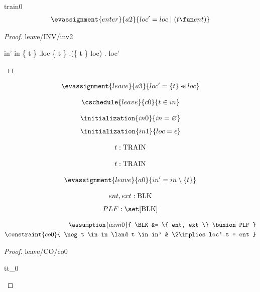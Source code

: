 \documentclass[12pt]{amsart}
\begin{document}
\begin{machine}{train0}
\begin{align*}
\evassignment{enter}{a2}
{	loc' = loc  \1| (t \fun ent)	}
\end{align*}

\begin{proof}{leave/INV/inv2}
	\begin{calculation}
		in'
	\hint{=}{ \ref{a0} }
		in \setminus \{ t \}
	\hint{=}{ \ref{inv2} }
		\dom.loc \setminus \{ t \}
		\dom.(\{ t \} \domsub loc)
	\hint{=}{ \ref{a3} } 
		\dom. loc' 
	\end{calculation}
\end{proof}

\begin{align*}
\evassignment{leave}{a3}
{	loc' = \{ t \} \domsub loc 	}
\end{align*}

\begin{align*}
\cschedule{leave}{c0}
{	t \in in}
\end{align*}

\begin{align*}
\initialization{in0}
{	in = \emptyset	}
\end{align*}
\begin{align*}
\initialization{in1}
{	loc = \emptyfun	}
\end{align*}


\begin{align*}
\indices{leave}{	t: \TRAIN}
\end{align*}

\begin{align*}
\indices{enter}{	t: \TRAIN}
\end{align*}

\begin{align*}
\evassignment{leave}{a0}
{	in' = in \setminus \{ t \}	}
\end{align*}

\begin{align*}
\constant{	ent,ext : \BLK}
\end{align*}
\begin{align*}
\constant{	PLF : \set [\BLK]}
\end{align*}

\begin{align*}
\assumption{axm0}
{	\BLK &= \{ ent, ext \} \bunion PLF	} \\
\constraint{co0}
{	\neg t \in in \land t \in in' & \2\implies  loc'.t = ent } %
\end{align*}
%
\begin{proof}{leave/CO/co0}
	\begin{free:var}{t}{t_0}
	

\end{free:var}
\end{proof}
\end{machine}
\end{document}
